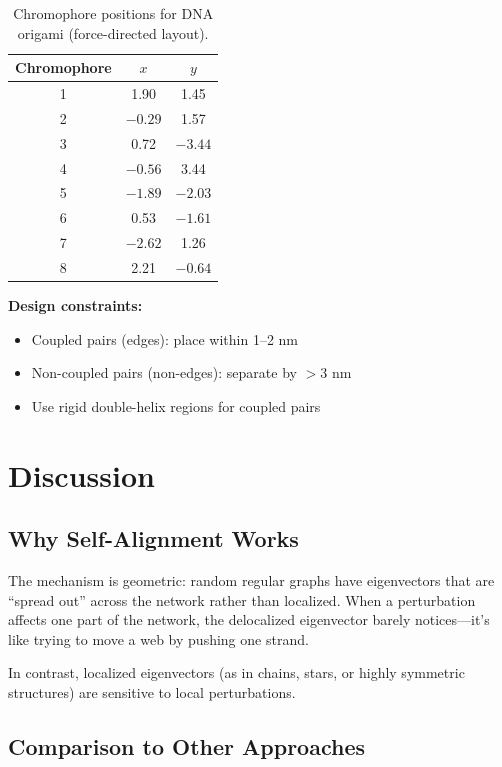 \documentclass[11pt,a4paper]{article}
\theoremstyle{plain}
\theoremstyle{definition}
\theoremstyle{remark}
\begin{document}
\begin{table}[H]
\centering
\begin{tabular}{@{}ccc@{}}
\toprule
\textbf{Chromophore} & \textbf{$x$} & \textbf{$y$} \\
\midrule
1 & 1.90 & 1.45 \\
2 & $-0.29$ & 1.57 \\
3 & 0.72 & $-3.44$ \\
4 & $-0.56$ & 3.44 \\
5 & $-1.89$ & $-2.03$ \\
6 & 0.53 & $-1.61$ \\
7 & $-2.62$ & 1.26 \\
8 & 2.21 & $-0.64$ \\
\bottomrule
\end{tabular}
\caption{Chromophore positions for DNA origami (force-directed layout).}
\end{table}

\textbf{Design constraints:}
\begin{itemize}
    \item Coupled pairs (edges): place within 1--2 nm
    \item Non-coupled pairs (non-edges): separate by $>3$ nm
    \item Use rigid double-helix regions for coupled pairs
\end{itemize}

\section{Discussion}

\subsection{Why Self-Alignment Works}

The mechanism is geometric: random regular graphs have eigenvectors that are ``spread out'' across the network rather than localized. When a perturbation affects one part of the network, the delocalized eigenvector barely notices---it's like trying to move a web by pushing one strand.

In contrast, localized eigenvectors (as in chains, stars, or highly symmetric structures) are sensitive to local perturbations.

\subsection{Comparison to Other Approaches}
\end{document}
